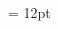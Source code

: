 \documentclass[gps1,twoside]{article}
\begin{document}
\begin{spacing}{0.916666666666667}
\begin{center}
\begin{center}
\section*{}\end{center}
\end{center}\end{spacing}\setlength{\columnsep}{12pt} 
\setlength\columnseprule{0.4pt} 
\begin{multicols}{2}\begin{spacing}{0.458333333333333}{\raggedright} \begin{spacing}{0.458333333333333}
\hangindent= 12pt
 \headwordggoTeluINentryletDatadicBody{}\spanenpronunciationggofonipaxemicpronunciationsentryletDatadicBody{[}\spanenpronunciationggofonipaxemicpronunciationsentryletDatadicBody{]}  \grammaticalinfosensesensesentryletDatadicBody{} \end{spacing}
 \end{spacing}\end{multicols}
\end{document}
